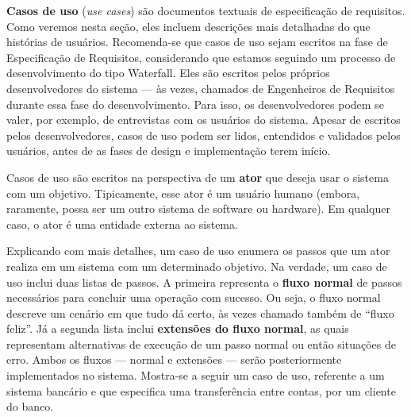 \documentclass[
  11pt,
  twoside]{book}
\begin{document}
 \textbf{Casos de uso} (\emph{use cases}) são
documentos textuais de especificação de requisitos. Como veremos nesta
seção, eles incluem descrições mais detalhadas do que histórias de
usuários. Recomenda-se que casos de uso sejam escritos na fase de
Especificação de Requisitos, considerando que estamos seguindo um
processo de desenvolvimento do tipo Waterfall. Eles são escritos pelos
próprios desenvolvedores do sistema --- às vezes, chamados de
Engenheiros de Requisitos durante essa fase do desenvolvimento. Para
isso, os desenvolvedores podem se valer, por exemplo, de entrevistas com
os usuários do sistema. Apesar de escritos pelos desenvolvedores, casos
de uso podem ser lidos, entendidos e validados pelos usuários, antes de
as fases de design e implementação terem início.

 Casos de uso são escritos na perspectiva de um
\textbf{ator} que deseja usar o sistema com um objetivo. Tipicamente,
esse ator é um usuário humano (embora, raramente, possa ser um outro
sistema de software ou hardware). Em qualquer caso, o ator é uma
entidade externa ao sistema.

 
Explicando com mais detalhes, um caso de uso enumera os passos que um
ator realiza em um sistema com um determinado objetivo. Na verdade, um
caso de uso inclui duas listas de passos. A primeira representa o
\textbf{fluxo normal} de passos necessários para concluir uma operação
com sucesso. Ou seja, o fluxo normal descreve um cenário em que tudo dá
certo, às vezes chamado também de ``fluxo feliz''. Já a segunda lista
inclui \textbf{extensões do fluxo normal}, as quais representam
alternativas de execução de um passo normal ou então situações de erro.
Ambos os fluxos --- normal e extensões --- serão posteriormente
implementados no sistema. Mostra-se a seguir um caso de uso, referente a
um sistema bancário e que especifica uma transferência entre contas, por
um cliente do banco.
\end{document}
